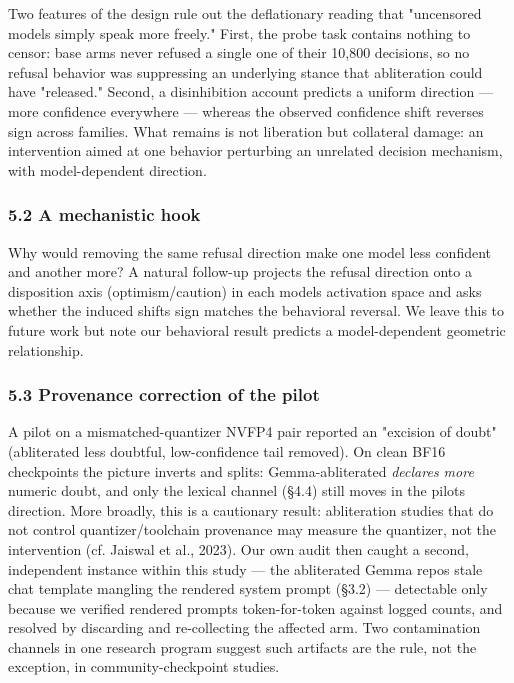 \documentclass[
  10pt,
]{article}
\begin{document}
Two features of the design rule out the deflationary reading that
"uncensored models simply speak more freely." First, the probe task
contains nothing to censor: base arms never refused a single one of
their 10,800 decisions, so no refusal behavior was suppressing an
underlying stance that abliteration could have "released." Second, a
disinhibition account predicts a uniform direction --- more confidence
everywhere --- whereas the observed confidence shift reverses sign
across families. What remains is not liberation but collateral damage:
an intervention aimed at one behavior perturbing an unrelated decision
mechanism, with model-dependent direction.

\subsubsection{5.2 A mechanistic hook}\label{52-a-mechanistic-hook}

Why would removing the same refusal direction make one model less
confident and another more? A natural follow-up projects the refusal
direction onto a disposition axis (optimism/caution) in each
model\textquotesingle s activation space and asks whether the induced
shift\textquotesingle s sign matches the behavioral reversal. We leave
this to future work but note our behavioral result predicts a
model-dependent geometric relationship.

\subsubsection{5.3 Provenance correction of the
pilot}\label{53-provenance-correction-of-the-pilot}

A pilot on a mismatched-quantizer NVFP4 pair reported an "excision of
doubt" (abliterated less doubtful, low-confidence tail removed). On
clean BF16 checkpoints the picture inverts and splits: Gemma-abliterated
\emph{declares more} numeric doubt, and only the lexical channel (§4.4)
still moves in the pilot\textquotesingle s direction. More broadly, this
is a cautionary result: abliteration studies that do not control
quantizer/toolchain provenance may measure the quantizer, not the
intervention (cf. Jaiswal et al., 2023). Our own audit then caught a
second, independent instance within this study --- the abliterated Gemma
repo\textquotesingle s stale chat template mangling the rendered system
prompt (§3.2) --- detectable only because we verified rendered prompts
token-for-token against logged counts, and resolved by discarding and
re-collecting the affected arm. Two contamination channels in one
research program suggest such artifacts are the rule, not the exception,
in community-checkpoint studies.
\end{document}
